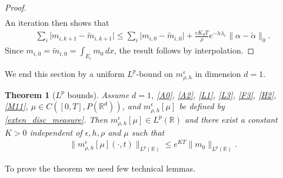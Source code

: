 \documentclass[a4paper,  twoside, 10pt, leqno]{amsart}
\newcommand{\R}{\mathbb{R}}
\newcommand{\rd}{\mathbb{R}^d}
\newtheorem{thm}{Theorem}[section]
\theoremstyle{remark}
\theoremstyle{definition}
\begin{document}
\begin{proof}
\begin{align*}
    \end{align*}
  An iteration then shows that 
     \begin{align*}
        \sum_{i} \big|  m_{i,k+1} - \tilde{m}_{i,k+1} \big| \leq    \sum_{i} \big| m_{i,0} - \tilde{m}_{i,0}  \big| + \frac{cK_{d}T}{\rho} e^{- h \lambda_{r}} \| \alpha - \tilde{\alpha}   \|_{0} .
    \end{align*}
Since $ m_{i,0} = \tilde{m}_{i,0}=\int_{E_i}m_0 \, dx$, the result follows by interpolation.
\end{proof}

We end this section by  a uniform $L^p$-bound on $m^{\epsilon}_{\rho,h}$ in dimension $d=1$. 
\begin{thm}[$L^p$ bounds]\label{thm:Lp_esti}
 Assume $d=1$, \ref{A0}, \ref{A2}, \ref{L1}, \ref{L3}, \ref{F3}, \ref{H2}, \ref{M11},  $\mu \in  C ( [0,T], P ( \rd ))$, and  $m^{\epsilon}_{\rho,h}[\mu]$ be defined by \eqref{exten_disc_measure}. Then $m_{\rho,h}^{\epsilon}[\mu] \in L^p(\R)$ and there exist a constant $K>0$ independent of $\epsilon,h, \rho$ and $\mu$ such that
\begin{align*}
\|m^{\epsilon}_{\rho, h}[\mu](\cdot, t)\|_{L^{p}(\R)} \leq e^{KT} \|m_{0}\|_{L^{p}(\R)}. 
\end{align*} 
\end{thm}\medskip




To prove the theorem we need few technical lemmas.  
\end{document}
